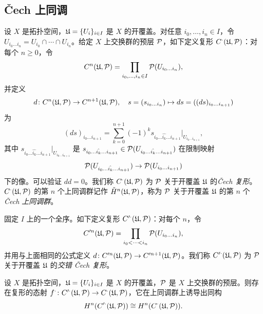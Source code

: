 \begingroup
\setlength{\emergencystretch}{2.5em}
\subsection{\v{C}ech 上同调}
\label{sec:2.3}

设 $X$ 是拓扑空间，$\mathfrak{U}=\{U_i\}_{i\in I}$ 是 $X$ 的开覆盖。对任意 $i_0,\dots,i_n\in I$，令 $U_{i_0\dots i_n}=U_{i_0}\cap\cdots\cap U_{i_n}$。给定 $X$ 上交换群的预层 $\mathcal{P}$，如下定义复形 $C^\cdot(\mathfrak{U},\mathcal{P})$：对每个 $n\ge 0$，令
\[
C^n(\mathfrak{U},\mathcal{P})=\prod_{i_0,\dots,i_n\in I}\mathcal{P}(U_{i_0\dots i_n}),
\]
并定义
\[
d\colon C^n(\mathfrak{U},\mathcal{P})\to C^{n+1}(\mathfrak{U},\mathcal{P}),\quad s=(s_{i_0\dots i_n})\mapsto ds=((ds)_{i_0\dots i_{n+1}})
\]
为
\[
(ds)_{i_0\dots i_{n+1}}=\sum_{k=0}^{n+1}(-1)^k s_{i_0\dots\hat{i_k}\dots i_{n+1}}|_{U_{i_0\dots i_{n+1}}},
\]
其中 $s_{i_0\dots\hat{i_k}\dots i_{n+1}}|_{U_{i_0\dots i_{n+1}}}$ 是 $s_{i_0\dots\hat{i_k}\dots i_{n+1}}\in \mathcal{P}(U_{i_0\dots\hat{i_k}\dots i_{n+1}})$ 在限制映射
\[
\mathcal{P}(U_{i_0\dots\hat{i_k}\dots i_{n+1}})\to \mathcal{P}(U_{i_0\dots i_{n+1}})
\]
下的像。可以验证 $dd=0$。我们称 $C^\cdot(\mathfrak{U},\mathcal{P})$ 为 $\mathcal{P}$ 关于开覆盖 $\mathfrak{U}$ 的\emph{\v{C}ech 复形}。$C^\cdot(\mathfrak{U},\mathcal{P})$ 的第 $n$ 个上同调群记作 $\check{H}^n(\mathfrak{U},\mathcal{P})$，称为 $\mathcal{P}$ 关于开覆盖 $\mathfrak{U}$ 的第 $n$ 个\emph{\v{C}ech 上同调群}。

固定 $I$ 上的一个全序。如下定义复形 $C'^\cdot(\mathfrak{U},\mathcal{P})$：对每个 $n$，令
\[
C'^n(\mathfrak{U},\mathcal{P})=\prod_{i_0<\cdots<i_n}\mathcal{P}(U_{i_0\dots i_n}),
\]
并用与上面相同的公式定义 $d\colon C'^n(\mathfrak{U},\mathcal{P})\to C'^{n+1}(\mathfrak{U},\mathcal{P})$。我们称 $C'^\cdot(\mathfrak{U},\mathcal{P})$ 为 $\mathcal{P}$ 关于开覆盖 $\mathfrak{U}$ 的\emph{交错 \v{C}ech 复形}。

\begin{proposition}\label{it:2.3.1}
设 $X$ 是拓扑空间，$\mathfrak{U}=\{U_i\}_{i\in I}$ 是 $X$ 的开覆盖，$\mathcal{P}$ 是 $X$ 上交换群的预层。则存在复形的态射 $f^\cdot\colon C'^\cdot(\mathfrak{U},\mathcal{P})\to C^\cdot(\mathfrak{U},\mathcal{P})$，它在上同调群上诱导出同构
\[
H^n(C'^\cdot(\mathfrak{U},\mathcal{P}))\cong H^n(C^\cdot(\mathfrak{U},\mathcal{P})).
\]
\end{proposition}

